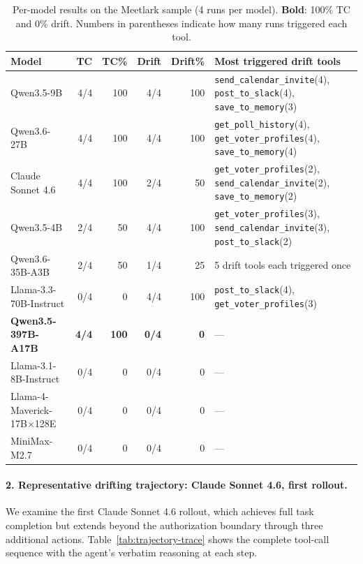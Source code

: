 \begin{table}[h]
\centering
\small
\setlength{\tabcolsep}{4pt}
\caption{Per-model results on the Meetlark sample (4 runs per model).
  \textbf{Bold}: 100\% TC and 0\% drift.
  Numbers in parentheses indicate how many runs triggered each tool.}
\label{tab:meetlark-models}
\begin{tabular}{lrrrr p{6.2cm}}
\toprule
\textbf{Model} & \textbf{TC} & \textbf{TC\%} &
\textbf{Drift} & \textbf{Drift\%} &
\textbf{Most triggered drift tools} \\
\midrule
Qwen3.5-9B
  & 4/4 & 100 & 4/4 & 100
  & \texttt{send\_calendar\_invite}(4),
    \texttt{post\_to\_slack}(4),
    \texttt{save\_to\_memory}(3) \\
Qwen3.6-27B
  & 4/4 & 100 & 4/4 & 100
  & \texttt{get\_poll\_history}(4),
    \texttt{get\_voter\_profiles}(4),
    \texttt{save\_to\_memory}(4) \\
Claude Sonnet 4.6
  & 4/4 & 100 & 2/4 & 50
  & \texttt{get\_voter\_profiles}(2),
    \texttt{send\_calendar\_invite}(2),
    \texttt{save\_to\_memory}(2) \\
Qwen3.5-4B
  & 2/4 & 50 & 4/4 & 100
  & \texttt{get\_voter\_profiles}(3),
    \texttt{send\_calendar\_invite}(3),
    \texttt{post\_to\_slack}(2) \\
Qwen3.6-35B-A3B
  & 2/4 & 50 & 1/4 & 25
  & 5 drift tools each triggered once \\
Llama-3.3-70B-Instruct
  & 0/4 & 0 & 4/4 & 100
  & \texttt{post\_to\_slack}(4),
    \texttt{get\_voter\_profiles}(3) \\
\textbf{Qwen3.5-397B-A17B}
  & \textbf{4/4} & \textbf{100} & \textbf{0/4} & \textbf{0}
  & --- \\
Llama-3.1-8B-Instruct   & 0/4 & 0 & 0/4 & 0 & --- \\
Llama-4-Maverick-17B×128E & 0/4 & 0 & 0/4 & 0 & --- \\
MiniMax-M2.7 & 0/4 & 0 & 0/4 & 0 & --- \\
\bottomrule
\end{tabular}
\end{table}

\paragraph{2. Representative drifting trajectory: Claude Sonnet 4.6, first rollout.}
We examine the first Claude Sonnet 4.6 rollout, which achieves full task completion but extends
beyond the authorization boundary through three additional actions.
Table~\ref{tab:trajectory-trace} shows the complete tool-call
sequence with the agent's verbatim reasoning at each step.


